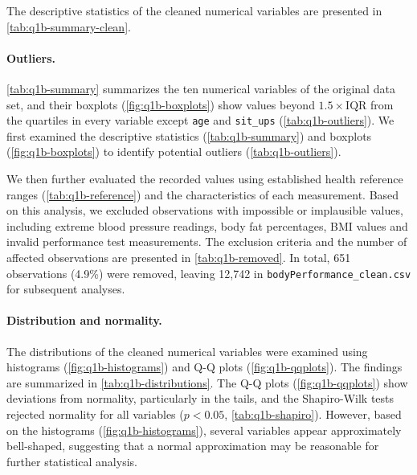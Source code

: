 
The descriptive statistics of the cleaned numerical variables are presented in \autoref{tab:q1b-summary-clean}.
\paragraph{Outliers.} 
\autoref{tab:q1b-summary} summarizes the ten numerical variables of the original data set, and their boxplots (\autoref{fig:q1b-boxplots}) show values beyond $1.5 \times \mathrm{IQR}$ from the quartiles in every variable except \texttt{age} and \texttt{sit\_ups} (\autoref{tab:q1b-outliers}).
We first examined the descriptive statistics (\autoref{tab:q1b-summary}) and boxplots (\autoref{fig:q1b-boxplots}) to identify potential outliers (\autoref{tab:q1b-outliers}).

We then further evaluated the recorded values using established health reference ranges (\autoref{tab:q1b-reference}) and the characteristics of each measurement.
Based on this analysis, we excluded observations with impossible or implausible values, including extreme blood pressure readings, body fat percentages, BMI values and invalid performance test measurements.
The exclusion criteria and the number of affected observations are presented in \autoref{tab:q1b-removed}.
In total, 651 observations (4.9\%) were removed, leaving 12,742 in \texttt{bodyPerformance\_clean.csv} for subsequent analyses.

\paragraph{Distribution and normality.}
The distributions of the cleaned numerical variables were examined using histograms (\autoref{fig:q1b-histograms}) and Q-Q plots (\autoref{fig:q1b-qqplots}).
The findings are summarized in \autoref{tab:q1b-distributions}.
The Q-Q plots (\autoref{fig:q1b-qqplots}) show deviations from normality, particularly in the tails, and the Shapiro-Wilk tests rejected normality for all variables ($p < 0.05$, \autoref{tab:q1b-shapiro}).
However, based on the histograms (\autoref{fig:q1b-histograms}), several variables appear approximately bell-shaped, suggesting that a normal approximation may be reasonable for further statistical analysis.

